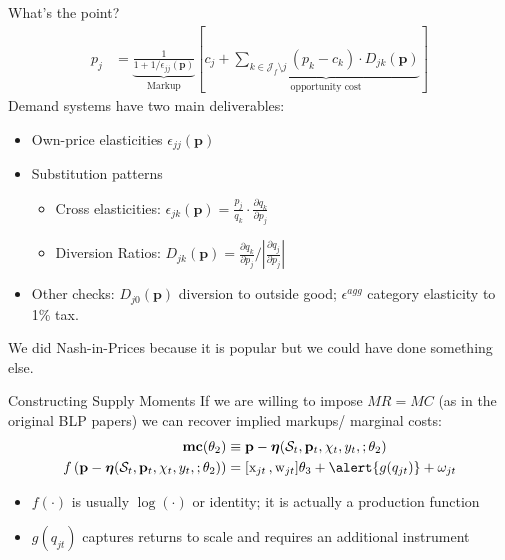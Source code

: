 \begin{frame}{What's the point?}
\begin{align*}
p_j &= \underbrace{\frac{1}{1+1/\epsilon_{jj}(\mathbf{p})}}_{\text{Markup}} \left[c_j + \underbrace{\sum_{k \in \mathcal{J}_{f} \setminus j}  (p_k-c_k) \cdot  D_{jk} (\mathbf{p}) }_{\text{opportunity cost}}\right]
\end{align*}
Demand systems have two main deliverables:
\begin{itemize}
\item Own-price elasticities $\epsilon_{jj}(\mathbf{p})$
\item Substitution patterns
\begin{itemize}
\item Cross elasticities: $\epsilon_{jk}(\mathbf{p}) = \frac{p_j}{q_k} \cdot \frac{\partial q_k}{\partial p_j}$
\item Diversion Ratios: $D_{jk}(\mathbf{p}) = \frac{\partial q_k}{\partial p_j}/|\frac{\partial q_j}{\partial p_j}|$
\end{itemize}
\item Other checks: $D_{j0}(\mathbf{p})$ diversion to outside good; $\epsilon^{agg}$ category elasticity to 1\% tax.
\end{itemize}
We did Nash-in-Prices because it is popular but we could have done something else.
\end{frame}









\begin{frame}{Constructing Supply Moments}
If we are willing to impose $MR = MC$ (as in the original BLP papers) we can recover implied markups/ marginal costs:
\begin{align*}
\mathbf{mc}(\theta_2)&\equiv \mathbf{p}- \boldsymbol{\eta}(\mathcal{S}_t,\mathbf{p}_t,\chi_t, y_t, ;\theta_2) \\
f\left(\mathbf{p}- \boldsymbol{\eta}(\mathcal{S}_t,\mathbf{p}_t,\chi_t, y_t, ;\theta_2)  \right) &= [\textrm{x}_{jt} \,, \textrm{w}_{jt}] \theta_3 + \alert{g(q_{jt})} +  \omega_{jt}
\end{align*}
\begin{itemize}
\item $f(\cdot)$ is usually $\log(\cdot)$ or identity; it is actually a \alert{production function}
\item $g(q_{jt})$ captures \alert{returns to scale} and requires an additional \alert{instrument}
\end{itemize}
\end{frame}

